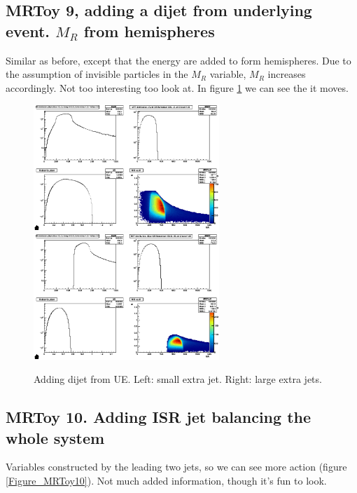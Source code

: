 \documentclass{fheadnote}
\begin{document}
\subsection{MRToy 9, adding a dijet from underlying event.  $M_R$ from hemispheres}

Similar as before, except that the energy are added to form hemispheres.  Due to the assumption of invisible particles in the $M_R$ variable, $M_R$ increases accordingly.
Not too interesting too look at.  In figure \ref{Figure_MRToy9} we can see the it moves.

\begin{figure}[htbp]
   \centering
   \includegraphics[width=7cm]{Figures/MRToy9_SmallJet}
   \includegraphics[width=7cm]{Figures/MRToy9_LargeJet}
   \caption{Adding dijet from UE.  Left: small extra jet.  Right: large extra jets.}
   \label{Figure_MRToy9}
\end{figure}

\subsection{MRToy 10.  Adding ISR jet balancing the whole system}

Variables constructed by the leading two jets, so we can see more action (figure \ref{Figure_MRToy10}).  Not much added information, though it's fun to look.
\end{document}
